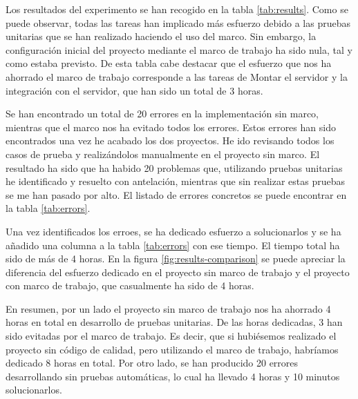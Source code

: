 Los resultados del experimento se han recogido en la tabla \cref{tab:results}. Como se puede observar, todas las tareas han implicado más esfuerzo debido a las pruebas unitarias que se han realizado haciendo el uso del marco. Sin embargo, la configuración inicial del proyecto mediante el marco de trabajo ha sido nula, tal y como estaba previsto. De esta tabla cabe destacar que el esfuerzo que nos ha ahorrado el marco de trabajo corresponde a las tareas de Montar el servidor y la integración con el servidor, que han sido un total de 3 horas.

Se han encontrado un total de 20 errores en la implementación sin marco, mientras que el marco nos ha evitado todos los errores. Estos errores han sido encontrados una vez he acabado los dos proyectos. He ido revisando todos los casos de prueba y realizándolos manualmente en el proyecto sin marco. El resultado ha sido que ha habido 20 problemas que, utilizando pruebas unitarias he identificado y resuelto con antelación, mientras que sin realizar estas pruebas se me han pasado por alto. El listado de errores concretos se puede encontrar en la tabla \cref{tab:errors}.

Una vez identificados los erroes, se ha dedicado esfuerzo a solucionarlos y se ha añadido una columna a la tabla \cref{tab:errors} con ese tiempo. El tiempo total ha sido de más de 4 horas. En la figura \cref{fig:results-comparison} se puede apreciar la diferencia del esfuerzo dedicado en el proyecto sin marco de trabajo y el proyecto con marco de trabajo, que casualmente ha sido de 4 horas.

En resumen, por un lado el proyecto sin marco de trabajo nos ha ahorrado 4 horas en total en desarrollo de pruebas unitarias. De las horas dedicadas, 3 han sido evitadas por el marco de trabajo. Es decir, que si hubiésemos realizado el proyecto sin código de calidad, pero utilizando el marco de trabajo, habríamos dedicado 8 horas en total. Por otro lado, se han producido 20 errores desarrollando sin pruebas automáticas, lo cual ha llevado 4 horas y 10 minutos solucionarlos.

